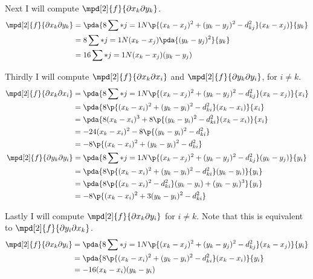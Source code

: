 \documentclass[11pt, oneside]{article}
\begin{document}
\begin{enumerate}
\begin{enumerate}
        Next I will compute $\mpd[2]{f}{\partial x_k \partial y_k}$.
        \begin{align*}
          \mpd[2]{f}{\partial x_k \partial y_k} &= \pda{8 \sum*{j = 1}{N}{\p{(x_k - x_j)^2 + (y_k - y_j)^2 - d_{kj}^2}(x_k - x_j)}}{y_k} \\
          &= 8 \sum*{j = 1}{N}{(x_k - x_j)\pda{(y_k - y_j)^2}{y_k}} \\
          &= 16 \sum*{j = 1}{N}{(x_k - x_j)(y_k - y_j)}
        \end{align*}

        Thirdly I will compute $\mpd[2]{f}{\partial x_k \partial x_i}$ and
        $\mpd[2]{f}{\partial y_k \partial y_i}$, for $i \neq k$.
        \begin{align*}
          \mpd[2]{f}{\partial x_k \partial x_i} &= \pda{8 \sum*{j = 1}{N}{\p{(x_k - x_j)^2 + (y_k - y_j)^2 - d_{kj}^2}(x_k - x_j)}}{x_i} \\
          &= \pda{8\p{(x_k - x_i)^2 + (y_k - y_i)^2 - d_{ki}^2}(x_k - x_i)}{x_i} \\
          &= \pda{8(x_k - x_i)^3 +8\p{(y_k - y_i)^2 - d_{ki}^2}(x_k - x_i)}{x_i} \\
          &= -24(x_k - x_i)^2 - 8\p{(y_k - y_i)^2 - d_{ki}^2} \\
          &= -8\p{(x_k - x_i)^2 + (y_k - y_i)^2 - d_{ki}^2} \\
          \mpd[2]{f}{\partial y_k \partial y_i} &= \pda{8 \sum*{j = 1}{N}{\p{(x_k - x_j)^2 + (y_k - y_j)^2 - d_{kj}^2}(y_k - y_j)}}{y_i} \\
          &= \pda{8 \p{(x_k - x_i)^2 + (y_k - y_i)^2 - d_{ki}^2}(y_k - y_i)}{y_i} \\
          &= \pda{8 \p{(x_k - x_i)^2 - d_{ki}^2}(y_k - y_i)+ (y_k - y_i)^3}{y_i} \\
          &= -8 \p{(x_k - x_i)^2 + 3(y_k - y_i)^2 - d_{ki}^2}
        \end{align*}

        Lastly I will compute $\mpd[2]{f}{\partial x_k \partial y_i}$ for
        $i \neq k$.
        Note that this is equivalent to $\mpd[2]{f}{\partial y_i \partial x_k}$.
        \begin{align*}
          \mpd[2]{f}{\partial x_k \partial y_i} &= \pda{8 \sum*{j = 1}{N}{\p{(x_k - x_j)^2 + (y_k - y_j)^2 - d_{kj}^2}(x_k - x_j)}}{y_i} \\
          &= \pda{8 \p{(x_k - x_i)^2 + (y_k - y_i)^2 - d_{ki}^2}(x_k - x_i)}{y_i} \\
          &= -16(x_k - x_i)(y_k - y_i)
        \end{align*}


\end{enumerate}
\end{enumerate}
\end{document}
